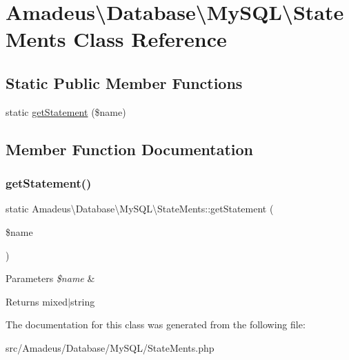 \hypertarget{classAmadeus_1_1Database_1_1MySQL_1_1StateMents}{}\section{Amadeus\textbackslash{}Database\textbackslash{}My\+S\+QL\textbackslash{}State\+Ments Class Reference}
\label{classAmadeus_1_1Database_1_1MySQL_1_1StateMents}
\subsection*{Static Public Member Functions}
\begin{DoxyCompactItemize}
\item 
static \hyperlink{classAmadeus_1_1Database_1_1MySQL_1_1StateMents_af99bd03b3559611d7c074e753586df54}{get\+Statement} (\$name)
\end{DoxyCompactItemize}


\subsection{Member Function Documentation}
\mbox{\label{classAmadeus_1_1Database_1_1MySQL_1_1StateMents_af99bd03b3559611d7c074e753586df54}} 
\subsubsection{\texorpdfstring{get\+Statement()}{getStatement()}}
{\footnotesize\ttfamily static Amadeus\textbackslash{}\+Database\textbackslash{}\+My\+S\+Q\+L\textbackslash{}\+State\+Ments\+::get\+Statement (\begin{DoxyParamCaption}\item[{}]{\$name }\end{DoxyParamCaption})\hspace{0.3cm}{\ttfamily [static]}}


\begin{DoxyParams}{Parameters}
{\em \$name} & \\
\hline
\end{DoxyParams}
\begin{DoxyReturn}{Returns}
mixed$\vert$string 
\end{DoxyReturn}


The documentation for this class was generated from the following file\+:\begin{DoxyCompactItemize}
\item 
src/\+Amadeus/\+Database/\+My\+S\+Q\+L/State\+Ments.\+php\end{DoxyCompactItemize}
